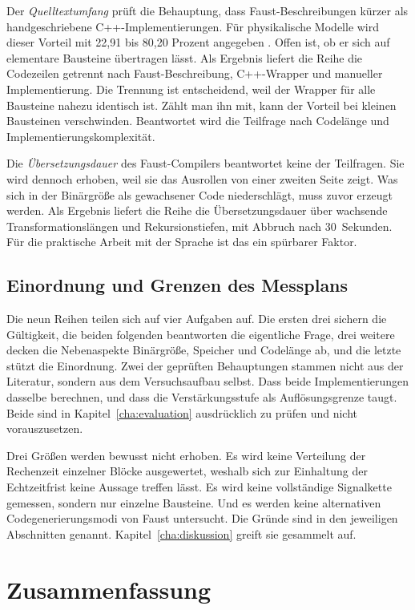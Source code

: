 Der \emph{Quelltextumfang} prüft die Behauptung, dass Faust-Beschreibungen
kürzer als handgeschriebene C++-Implementierungen. Für physikalische
Modelle wird dieser Vorteil mit 22,91 bis 80,20 Prozent angegeben
\parencite{michon2011fauststk}. Offen ist, ob er sich auf elementare Bausteine übertragen lässt. Als Ergebnis liefert die Reihe die Codezeilen getrennt nach Faust-Beschreibung, C++-Wrapper und manueller Implementierung. Die Trennung ist entscheidend, weil der Wrapper für alle Bausteine nahezu identisch ist. Zählt man ihn mit, kann der Vorteil bei kleinen Bausteinen verschwinden. Beantwortet wird die Teilfrage nach Codelänge und Implementierungskomplexität.

Die \emph{Übersetzungsdauer} des Faust-Compilers beantwortet keine der
Teilfragen. Sie wird dennoch erhoben, weil sie das Ausrollen von einer zweiten Seite zeigt. Was sich in der Binärgröße als gewachsener Code niederschlägt,
muss zuvor erzeugt werden. Als Ergebnis liefert die Reihe die Übersetzungsdauer
über wachsende Transformationslängen und Rekursionstiefen, mit Abbruch nach
30~Sekunden. Für die praktische Arbeit mit der Sprache ist das ein spürbarer
Faktor.

\subsection{Einordnung und Grenzen des Messplans}

Die neun Reihen teilen sich auf vier Aufgaben auf. Die ersten drei
sichern die Gültigkeit, die beiden folgenden beantworten die eigentliche
Frage, drei weitere decken die Nebenaspekte Binärgröße, Speicher und
Codelänge ab, und die letzte stützt die Einordnung. Zwei der geprüften
Behauptungen stammen nicht aus der Literatur, sondern aus dem Versuchsaufbau
selbst. Dass beide Implementierungen dasselbe berechnen, und dass die
Verstärkungsstufe als Auflösungsgrenze taugt. Beide sind in
Kapitel~\ref{cha:evaluation} ausdrücklich zu prüfen und nicht vorauszusetzen.

Drei Größen werden bewusst nicht erhoben. Es wird keine Verteilung der
Rechenzeit einzelner Blöcke ausgewertet, weshalb sich zur Einhaltung der
Echtzeitfrist keine Aussage treffen lässt. Es wird keine vollständige
Signalkette gemessen, sondern nur einzelne Bausteine. Und es werden keine
alternativen Codegenerierungsmodi von Faust untersucht. Die Gründe sind in
den jeweiligen Abschnitten genannt. Kapitel~\ref{cha:diskussion} greift sie
gesammelt auf.

\section{Zusammenfassung}
\label{sec:versuchsdesign-zusammenfassung}

